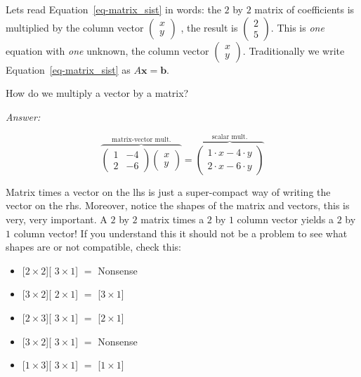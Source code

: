 \documentclass[
  letterpaper,
  DIV=11,
  numbers=noendperiod]{scrartcl}
\theoremstyle{definition}
\theoremstyle{remark}
\begin{document}
Lets read Equation~\ref{eq-matrix_sist} in words: the \(2\) by \(2\)
matrix of coefficients is multiplied by the column vector
\(\begin{pmatrix}x\\y\end{pmatrix}\) , the result is
\(\begin{pmatrix}2\\5\end{pmatrix}\). This is \emph{one} equation with
\emph{one} unknown, the column vector
\(\begin{pmatrix}x\\y\end{pmatrix}\). Traditionally we write
Equation~\ref{eq-matrix_sist} as \(A \mathbf{x} =\mathbf{b}\).

How do we multiply a vector by a matrix?

\emph{Answer:}

\[
\overbrace{\begin{pmatrix} 1 & -4\\ 2 & -6 \end{pmatrix}\begin{pmatrix}x\\y\end{pmatrix}}^\text{matrix-vector mult.} =\overbrace{\begin{pmatrix}1\cdot x-4\cdot y \\ 2\cdot x-6\cdot y\end{pmatrix}}^\text{scalar mult.}
\]

Matrix times a vector on the lhs is just a super-compact way of writing
the vector on the rhs. Moreover, notice the shapes of the matrix and
vectors, this is very, very important. A \(2\) by \(2\) matrix times a
\(2\) by \(1\) column vector yields a \(2\) by \(1\) column vector! If
you understand this it should not be a problem to see what shapes are or
not compatible, check this:

\begin{itemize}
\item
  {[}\(2\times2\){]}{[} \(3\times 1\){]} \(=\) Nonsense
\item
  {[}\(3\times2\){]}{[} \(2\times 1\){]} \(=\) {[}\(3\times 1\){]}
\item
  {[}\(2\times3\){]}{[} \(3\times 1\){]} \(=\) {[}\(2\times 1\){]}
\item
  {[}\(3\times2\){]}{[} \(3\times 1\){]} \(=\) Nonsense
\item
  {[}\(1\times3\){]}{[} \(3\times 1\){]} \(=\) {[}\(1\times 1\){]}
\end{itemize}
\end{document}
